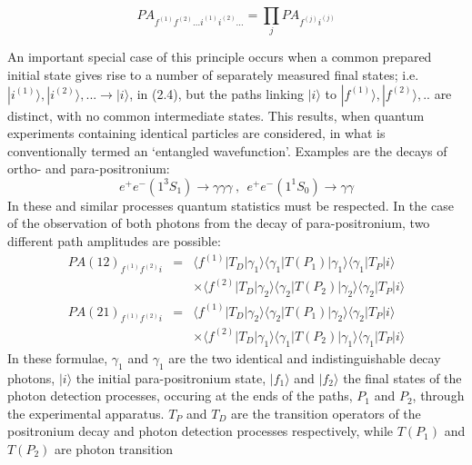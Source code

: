 {\begin{itemize}
   \begin{equation}   
    PA_{f^{(1)}f^{(2)}...i^{(1)}i^{(2)}...} = \prod_j PA_{f^{(j)}i^{(j)}} 
    \end{equation}
 \end{itemize} 
    An important special case of this principle occurs when a common prepared initial state
    gives rise to a number of separately measured final states; i.e.  $|i^{(1)}\rangle, |i^{(2)}\rangle,...
     \rightarrow |i\rangle$, in (2.4), but the paths linking $|i\rangle$ to
      $|f^{(1)}\rangle, |f^{(2)}\rangle,..$ are distinct, with no common intermediate states.
     This results, when quantum experiments containing identical particles are considered,
    in what is conventionally termed an `entangled wavefunction'. Examples are the decays
   of ortho- and para-positronium:
   \[ e^+e^-\left(1^3S_1\right) \rightarrow \gamma \gamma \gamma~,~~
    e^+e^-\left(1^1S_0\right) \rightarrow \gamma \gamma \]
     In these and similar processes quantum statistics must be respected.
     In the case of the observation of both photons from the decay of para-positronium,
     two different path amplitudes are possible:
     \begin{eqnarray}
     PA(12)_{f^{(1)}f^{(2)}i} & = & \langle f^{(1)}|T_D|\gamma_1\rangle \langle\gamma_1 |T(P_1)|\gamma_1\rangle
                           \langle\gamma_1 |T_{P}| i\rangle  \nonumber \\
                      &   & \times  \langle f^{(2)}|T_D|\gamma_2\rangle \langle\gamma_2 |T(P_2)|\gamma_2 \rangle
                           \langle \gamma_2 |T_{P}| i \rangle  \\
     PA(21)_{f^{(1)}f^{(2)}i} & = & \langle f^{(1)}|T_D|\gamma_2\rangle \langle\gamma_2 |T(P_1)|\gamma_2\rangle
                           \langle \gamma_2 |T_{P}| i\rangle  \nonumber \\
                      &   &  \times \langle f^{(2)}|T_D|\gamma_1\rangle \langle \gamma_1 |T(P_2)|\gamma_1 \rangle
                           \langle \gamma_1 |T_{P}| i \rangle  
     \end{eqnarray}
    In these formulae, $\gamma_1$ and  $\gamma_1$ are the two identical and indistinguishable decay
   photons, $|i\rangle$ the initial para-positronium state, $|f_1\rangle$ and $|f_2 \rangle$ 
   the final states of the
   photon detection processes, occuring at the ends of the paths, $P_1$ and $P_2$, through the experimental
   apparatus. $T_P$ and $T_D$ are the transition operators of the positronium decay and photon 
   detection processes respectively, while $T(P_1)$ and $T(P_2)$ are photon transition 
}

